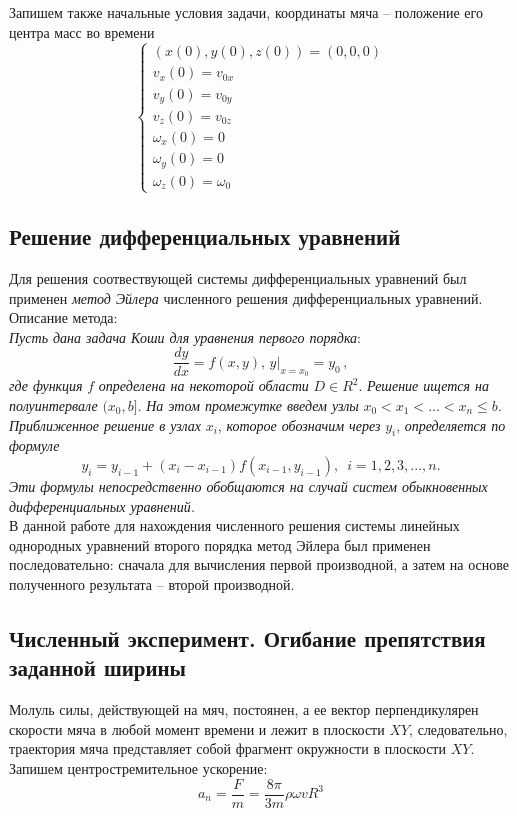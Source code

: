 \documentclass[a5paper, 10pt]{article}
\theoremstyle{definition}
\theoremstyle{plain}
\theoremstyle{remark}
\begin{document}
Запишем также начальные условия задачи, координаты мяча -- положение его центра масс во времени
\begin{equation}
\begin{cases}
\left(x (0), y(0), z(0) \right)  = \left(0, 0, 0\right)\\
v_{x} (0) = v_{0x}\\
v_{y} (0) = v_{0y}\\
v_{z} (0) = v_{0z}\\
\omega_{x} (0) = 0\\
\omega_{y} (0) = 0\\
\omega_{z} (0) = \omega_{0}
\end{cases}
\end{equation}
\subsection{Решение дифференциальных уравнений}
Для решения соотвествующей системы дифференциальных уравнений был применен \textit{метод Эйлера} численного решения дифференциальных уравнений. Описание метода:\\
\textit{Пусть дана задача Коши для уравнения первого порядка}:
$$ \frac{dy}{dx} = f(x, y), \, \left. y \right|_{x = x_0} = y_0 \, ,$$
\textit{где функция} $f$ \textit{определена на некоторой области} $D \in R^2$. \textit{Решение ищется на полуинтервале} $(x_0, b]$. \textit{На этом промежутке введем узлы} $x_0 < x_1 < ... < x_n \leq b$. \textit{Приближенное решение в узлах} $x_i$, \textit{которое обозначим через} $y_i$,  \textit{определяется по формуле}
$$y_i = y_{i-1} + (x_i - x_{i-1}) f(x_{i-1}, y_{i-1}), \, \, \, i = 1, 2, 3, ..., n.$$
\textit{Эти формулы непосредственно обобщаются на случай систем обыкновенных дифференциальных уравнений.}\\
В данной работе для нахождения численного решения системы линейных однородных уравнений второго порядка метод Эйлера был применен последовательно: сначала для вычисления первой производной, а затем на основе полученного результата -- второй производной.

\subsection{Численный эксперимент. Огибание препятствия заданной ширины}
Молуль силы, действующей на мяч, постоянен, а ее вектор перпендикулярен скорости мяча в любой момент времени и лежит в плоскости $XY$, следовательно, траектория мяча представляет собой фрагмент окружности в плоскости  $XY$. \\
Запишем центростремительное ускорение:
\begin{equation}
a_n = \frac{F}{m} = \frac{8\pi}{3m} \rho \omega v R^3
\end{equation}
\end{document}
